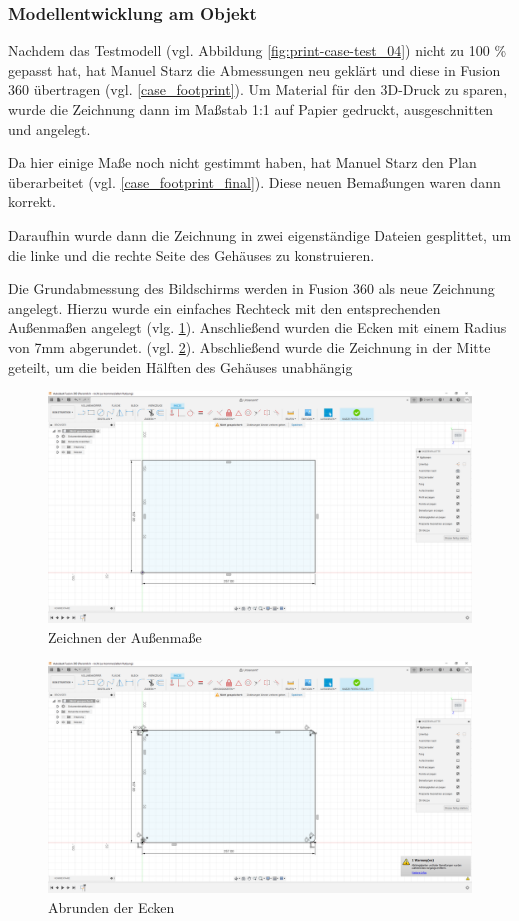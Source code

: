 \subsubsection{Modellentwicklung am Objekt}
Nachdem das Testmodell (vgl. Abbildung \ref{fig:print-case-test_04}) nicht zu 100 \% gepasst hat, hat Manuel Starz die Abmessungen neu geklärt und diese in Fusion 360 übertragen (vgl. \ref{case_footprint}). Um Material für den 3D-Druck zu sparen, wurde die Zeichnung dann im Maßstab 1:1 auf Papier gedruckt, ausgeschnitten und angelegt.\par
Da hier einige Maße noch nicht gestimmt haben, hat Manuel Starz den Plan überarbeitet (vgl. \ref{case_footprint_final}). Diese neuen Bemaßungen waren dann korrekt.\par
Daraufhin wurde dann die Zeichnung in zwei eigenständige Dateien gesplittet, um die linke und die rechte Seite des Gehäuses zu konstruieren.\par
Die Grundabmessung des Bildschirms werden in Fusion 360 als neue Zeichnung angelegt. Hierzu wurde ein einfaches Rechteck mit den entsprechenden Außenmaßen angelegt (vlg. \ref{fig:design-case-01}). Anschließend wurden die Ecken mit einem Radius von 7mm abgerundet. (vgl. \ref{fig:design-case-02}). Abschließend wurde die Zeichnung in der Mitte geteilt, um die beiden Hälften des Gehäuses unabhängig
\begin{figure}[h!tb]
	\includegraphics[width=1\textwidth]{img/konstruktion_gehaeuse_001.png}
	\caption[Zeichnen der Außenmaße]{Zeichnen der Außenmaße}
	\label{fig:design-case-01}
\end{figure}
\begin{figure}[h!tb]
	\includegraphics[width=1\textwidth]{img/konstruktion_gehaeuse_002.png}
	\caption[Abrunden der Ecken]{Abrunden der Ecken}
	\label{fig:design-case-02}
\end{figure}